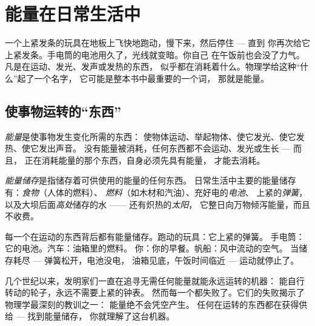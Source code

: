 \chapter{能量在日常生活中}\label{ch:g5:everyday-energy}

一个上紧发条的玩具在地板上飞快地跑动，慢下来，然后停住 --- 直到
你再次给它上紧发条。手电筒的电池用久了，光线就变暗。你自己
在午饭前也会没了力气。凡是在运动、发光、发声或发热的东西，
似乎都在消耗着什么。物理学给这种“什么”起了一个名字，
它可能是整本书中最重要的一个词，
那就是能量。

\section{使事物运转的“东西”}

\begin{definition}[能量]\label{def:g5:everyday-energy:energy}
\emph{能量}是使事物发生变化所需的东西：
使物体运动、举起物体、使它发光、使它发热、使它发出声音。
没有能量被消耗，任何东西都不会运动、发光或生长 --- 而且，
正在消耗能量的那个东西，自身必须先具有能量，
才能去消耗。
\end{definition}

\begin{definition}[能量储存]\label{def:g5:everyday-energy:store}
\emph{能量储存}是指储存着可供使用的能量的任何东西。
日常生活中主要的能量储存有：\emph{食物}（人体的燃料）、
\emph{燃料}（如木材和汽油）、充好电的\emph{电池}、
上紧的\emph{弹簧}，以及大坝后面\emph{高处}储存的水 ——
还有炽热的\emph{太阳}，
它整日向万物倾泻能量，而且不收费。
\end{definition}

\begin{example}[找出储存]\label{ex:g5:everyday-energy:spot}
每一个在运动的东西背后都有能量储存。跑动的玩具：它上紧的弹簧。
手电筒：它的电池。汽车：油箱里的燃料。
你：你的早餐。帆船：风中流动的空气。
当储存耗尽 --- 弹簧松开，电池没电，
油箱见底，午饭时间临近 --- 运动就停止了。
\end{example}

\begin{remark}\label{rem:g5:everyday-energy:nofree}
几个世纪以来，发明家们一直在追寻无需任何能量就能永远运转的机器：
能自行转动的轮子，永远不需要上紧的钟表。
然而每一个都失败了。它们的失败揭示了物理学最深刻的教训之一：
能量绝不会凭空产生。
任何在运转的东西都在获得供给 --- 找到能量储存，
你就理解了这台机器。
\end{remark}

